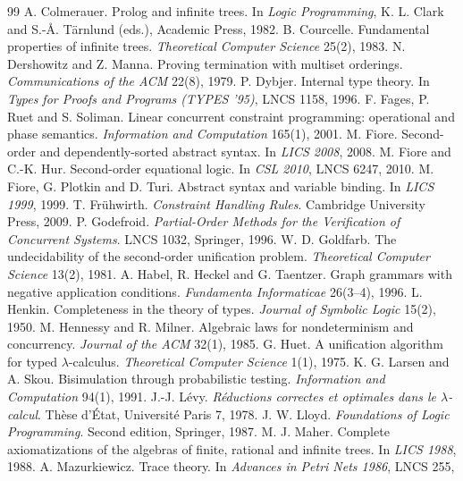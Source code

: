 \documentclass[11pt]{article}
\theoremstyle{remark}
\begin{document}
\begin{thebibliography}{99}
 A. Colmerauer. Prolog and infinite trees. In \emph{Logic Programming}, K. L. Clark
  and S.-{\AA}. T\"arnlund (eds.), Academic Press, 1982.
 B. Courcelle. Fundamental properties of infinite trees. \emph{Theoretical Computer
  Science} 25(2), 1983.
 N. Dershowitz and Z. Manna. Proving termination with multiset orderings.
  \emph{Communications of the ACM} 22(8), 1979.
 P. Dybjer. Internal type theory. In \emph{Types for Proofs and Programs (TYPES '95)},
  LNCS 1158, 1996.
 F. Fages, P. Ruet and S. Soliman. Linear concurrent constraint programming:
  operational and phase semantics. \emph{Information and Computation} 165(1), 2001.
 M. Fiore. Second-order and dependently-sorted abstract syntax. In \emph{LICS 2008}, 2008.
 M. Fiore and C.-K. Hur. Second-order equational logic. In \emph{CSL 2010}, LNCS 6247,
  2010.
 M. Fiore, G. Plotkin and D. Turi. Abstract syntax and variable binding. In \emph{LICS 1999},
  1999.
 T. Fr\"uhwirth. \emph{Constraint Handling Rules}. Cambridge University Press, 2009.
 P. Godefroid. \emph{Partial-Order Methods for the Verification of Concurrent Systems}.
  LNCS 1032, Springer, 1996.
 W. D. Goldfarb. The undecidability of the second-order unification problem.
  \emph{Theoretical Computer Science} 13(2), 1981.
 A. Habel, R. Heckel and G. Taentzer. Graph grammars with negative application conditions.
  \emph{Fundamenta Informaticae} 26(3--4), 1996.
 L. Henkin. Completeness in the theory of types. \emph{Journal of Symbolic Logic} 15(2),
  1950.
 M. Hennessy and R. Milner. Algebraic laws for nondeterminism and concurrency.
  \emph{Journal of the ACM} 32(1), 1985.
 G. Huet. A unification algorithm for typed $\lambda$-calculus. \emph{Theoretical Computer
  Science} 1(1), 1975.
 K. G. Larsen and A. Skou. Bisimulation through probabilistic testing.
  \emph{Information and Computation} 94(1), 1991.
 J.-J. L\'evy. \emph{R\'eductions correctes et optimales dans le $\lambda$-calcul}. Th\`ese
  d'\'Etat, Universit\'e Paris 7, 1978.
 J. W. Lloyd. \emph{Foundations of Logic Programming}. Second edition, Springer, 1987.
 M. J. Maher. Complete axiomatizations of the algebras of finite, rational and infinite
  trees. In \emph{LICS 1988}, 1988.
 A. Mazurkiewicz. Trace theory. In \emph{Advances in Petri Nets 1986}, LNCS 255,

\end{thebibliography}
\end{document}
